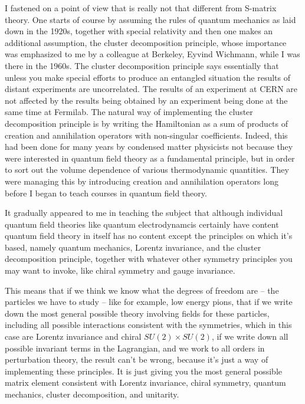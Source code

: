 I fastened on a point of view that is really not that different from S-matrix theory. One starts  of course by assuming the rules of quantum mechanics as laid down in the 1920s, together with special relativity and then one makes an additional assumption,  the cluster decomposition principle, whose importance was emphasized to me by a colleague at Berkeley, Eyvind Wichmann, while I was there in the 1960s. The cluster decomposition principle says essentially that unless you make special efforts to produce an entangled situation the results of distant experiments are uncorrelated. The results of an experiment at CERN are not affected by the results being obtained by an experiment being done at the same time at Fermilab.  
The natural way of implementing the cluster decomposition principle is by writing the Hamiltonian as a sum of products of creation and annihilation operators with non-singular coefficients. Indeed, this had been done for many years by condensed matter physicists not because they were interested in quantum field theory as a fundamental principle, but in order to sort out the volume dependence of various thermodynamic quantities.  They were managing this  by introducing creation and annihilation operators long before I began to teach courses in quantum field theory. 

It gradually appeared to me in teaching the subject that although individual quantum field theories like quantum electrodynamcis certainly have content  quantum field theory in itself has no content except the principles on which it's based, namely quantum mechanics, Lorentz invariance, and the cluster decomposition principle, together with whatever other symmetry principles you may want to invoke, like chiral symmetry and gauge invariance.

This means that if we think we know what the degrees of freedom are -- the particles we have to study -- like for example, low energy pions, that if we write down the most general possible theory involving fields for these particles, including all possible interactions consistent with the symmetries, which  in this case are Lorentz invariance and  chiral $SU(2)\times SU(2)$, if we write down all possible invariant terms in the Lagrangian, and we work to all orders in perturbation theory, the result can't be wrong, because it's just a way of implementing these principles. It is just giving you the most general possible matrix element consistent with Lorentz invariance, chiral symmetry, quantum mechanics, cluster decomposition, and  unitarity.

